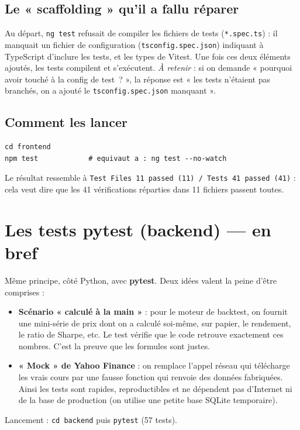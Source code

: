 \documentclass[11pt,a4paper]{article}
\newcommand{\code}[1]{\texttt{#1}}
\begin{document}
\subsection{Le « scaffolding » qu'il a fallu réparer}
Au départ, \code{ng test} refusait de compiler les fichiers de tests
(\code{*.spec.ts}) : il manquait un fichier de configuration
(\code{tsconfig.spec.json}) indiquant à TypeScript d'inclure les tests, et les
types de Vitest. Une fois ces deux éléments ajoutés, les tests compilent et
s'exécutent. \emph{À retenir} : si on demande « pourquoi avoir touché à la config
de test~? », la réponse est « les tests n'étaient pas branchés, on a ajouté le
\code{tsconfig.spec.json} manquant ».

\subsection{Comment les lancer}
\begin{lstlisting}
cd frontend
npm test            # equivaut a : ng test --no-watch
\end{lstlisting}
Le résultat ressemble à \code{Test Files 11 passed (11) / Tests 41 passed (41)} :
cela veut dire que les 41 vérifications réparties dans 11 fichiers passent toutes.

\section{Les tests pytest (backend) --- en bref}
Même principe, côté Python, avec \textbf{pytest}. Deux idées valent la peine
d'être comprises :
\begin{itemize}[leftmargin=1.4em,nosep]
  \item \textbf{Scénario « calculé à la main »} : pour le moteur de backtest, on
        fournit une mini-série de prix dont on a calculé soi-même, sur papier, le
        rendement, le ratio de Sharpe, etc. Le test vérifie que le code retrouve
        exactement ces nombres. C'est la preuve que les formules sont justes.
  \item \textbf{« Mock » de Yahoo Finance} : on remplace l'appel réseau qui
        télécharge les vrais cours par une fausse fonction qui renvoie des données
        fabriquées. Ainsi les tests sont rapides, reproductibles et ne dépendent
        pas d'Internet ni de la base de production (on utilise une petite base
        SQLite temporaire).
\end{itemize}
Lancement : \code{cd backend} puis \code{pytest} (57 tests).
\end{document}
